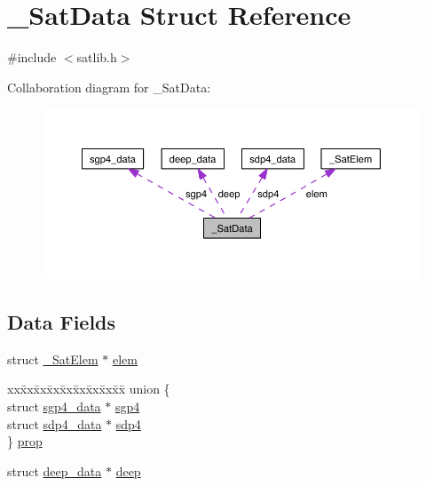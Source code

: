 \hypertarget{struct___sat_data}{\section{\-\_\-\-Sat\-Data Struct Reference}
\label{struct___sat_data}
}


{\ttfamily \#include $<$satlib.\-h$>$}



Collaboration diagram for \-\_\-\-Sat\-Data\-:
\nopagebreak
\begin{figure}[H]
\begin{center}
\leavevmode
\includegraphics[width=350pt]{struct___sat_data__coll__graph}
\end{center}
\end{figure}
\subsection*{Data Fields}
\begin{DoxyCompactItemize}
\item 
struct \hyperlink{struct___sat_elem}{\-\_\-\-Sat\-Elem} $\ast$ \hyperlink{struct___sat_data_a8f6ca40e052cd0bac7ed283fa35147ef}{elem}
\item 
\begin{tabbing}
xx\=xx\=xx\=xx\=xx\=xx\=xx\=xx\=xx\=\kill
union \{\\
\>struct \hyperlink{structsgp4__data}{sgp4\_data} $\ast$ \hyperlink{struct___sat_data_a67d36020c0d25eb5a4684978b7fd3df6}{sgp4}\\
\>struct \hyperlink{structsdp4__data}{sdp4\_data} $\ast$ \hyperlink{struct___sat_data_ab7bfd91966db6411332426656d1a62f4}{sdp4}\\
\} \hyperlink{struct___sat_data_afdd865c8d5f71af2985b7292db552364}{prop}\\

\end{tabbing}\item 
struct \hyperlink{structdeep__data}{deep\-\_\-data} $\ast$ \hyperlink{struct___sat_data_aaa92af6491d38cb39ac15847e645d907}{deep}
\end{DoxyCompactItemize}


